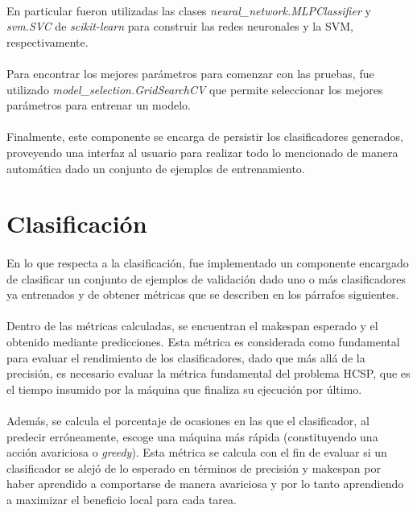 \paragraph{}En particular fueron utilizadas las clases \textit{neural\_network.MLPClassifier} y \textit{svm.SVC} de \textit{scikit-learn} para construir las redes neuronales y la SVM, respectivamente. 

\paragraph{} Para encontrar los mejores parámetros para comenzar con las pruebas, fue utilizado \textit{model\_selection.GridSearchCV} que permite seleccionar los mejores parámetros para entrenar un modelo. 

\paragraph{} Finalmente, este componente se encarga de persistir los clasificadores generados, proveyendo una interfaz al usuario para realizar todo lo mencionado de manera automática dado un conjunto de ejemplos de entrenamiento.

\section{Clasificación}

\paragraph{} En lo que respecta a la clasificación, fue implementado un componente encargado de clasificar un conjunto de ejemplos de validación dado uno o más clasificadores ya entrenados y de obtener métricas que se describen en los párrafos siguientes.

\paragraph{} Dentro de las métricas calculadas, se encuentran el makespan esperado y el obtenido mediante predicciones. Esta métrica es considerada como fundamental para evaluar el rendimiento de los clasificadores, dado que más allá de la precisión, es necesario evaluar la métrica fundamental del problema HCSP, que es el tiempo insumido por la máquina que finaliza su ejecución por último.

\paragraph{} Además, se calcula el porcentaje de ocasiones en las que el clasificador, al predecir erróneamente, escoge una máquina más rápida (constituyendo una acción avariciosa o \textit{greedy}). Esta métrica se calcula con el fin de evaluar si un clasificador se alejó de lo esperado en términos de precisión y makespan por haber aprendido a comportarse de manera avariciosa y por lo tanto aprendiendo a maximizar el beneficio local para cada tarea.
